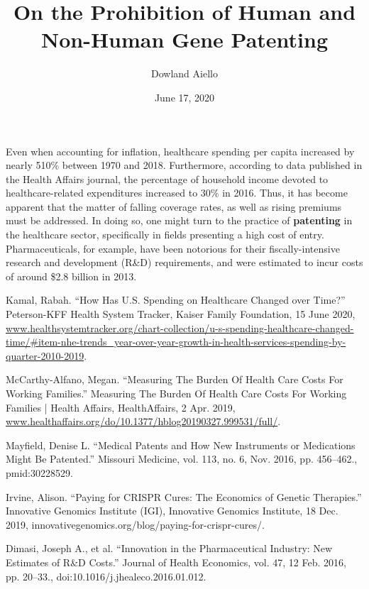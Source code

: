 \documentclass{article}
\begin{document}
\title{On the Prohibition of Human and Non-Human Gene Patenting}
\author{Dowland Aiello}
\date{June 17, 2020}

\maketitle
\tableofcontents
\fancyhf{}

\newpage

Even when accounting for inflation, healthcare spending per capita increased by
nearly 510\% between 1970 and 2018\cite{healthcare_spending}. Furthermore,
according to data published in the Health Affairs journal, the percentage of
household income devoted to healthcare-related expenditures increased to 30\% in
2016\cite{healthaffairs}. Thus, it has become apparent that the matter of
falling coverage rates, as well as rising premiums must be addressed. In doing
so, one might turn to the practice of \textbf{patenting} in the healthcare
sector, specifically in fields presenting a high cost of entry.
Pharmaceuticals, for example, have been notorious for their fiscally-intensive
research and development (R\&D) requirements, and were estimated to incur costs
of around \$2.8 billion in 2013\cite{pharmaceutical_randd_costs}.

\begin{thebibliography}{4}

	Kamal, Rabah. “How Has U.S. Spending on Healthcare Changed over Time?” Peterson-KFF Health System Tracker, Kaiser Family Foundation, 15 June 2020, \href{www.healthsystemtracker.org/chart-collection/u-s-spending-healthcare-changed-time/\#item-nhe-trends_year-over-year-growth-in-health-services-spending-by-quarter-2010-2019}{www.healthsystemtracker.org/chart-collection/u-s-spending-healthcare-changed-time/\#item-nhe-trends\_year-over-year-growth-in-health-services-spending-by-quarter-2010-2019}.

	McCarthy-Alfano, Megan. “Measuring The Burden Of Health Care Costs For Working Families.” Measuring The Burden Of Health Care Costs For Working Families | Health Affairs, HealthAffairs, 2 Apr. 2019, \href{www.healthaffairs.org/do/10.1377/hblog20190327.999531/full/}{www.healthaffairs.org/do/10.1377/hblog20190327.999531/full/}.

	Mayfield, Denise L. “Medical Patents and How New Instruments or Medications Might Be Patented.”
Missouri Medicine, vol. 113, no. 6, Nov. 2016, pp. 456–462., pmid:30228529.

	Irvine, Alison. “Paying for CRISPR Cures: The Economics of Genetic Therapies.” Innovative Genomics Institute (IGI), Innovative Genomics Institute, 18 Dec. 2019, innovativegenomics.org/blog/paying-for-crispr-cures/.

	Dimasi, Joseph A., et al. “Innovation in the Pharmaceutical Industry: New Estimates of R\&D Costs.” Journal of Health Economics, vol. 47, 12 Feb. 2016, pp. 20–33., doi:10.1016/j.jhealeco.2016.01.012.

\end{thebibliography}
\end{document}
